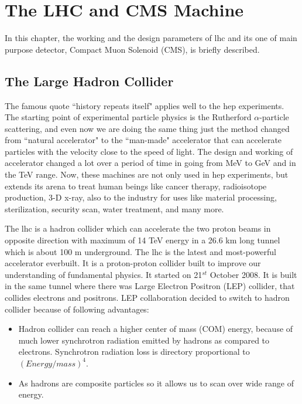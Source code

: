 \chapter{The LHC and CMS Machine} %
\label{cha:the_lhc_and_cms_machine}

In this chapter, the working and the design parameters of \acrfull{lhc} and its one of main purpose detector, Compact Muon Solenoid (CMS), is briefly described.


\section{The Large Hadron Collider} %
\label{sec:the_large_hadron_collider}

The famous quote ``history repeats itself" applies well to the \acrfull{hep} experiments. The starting point of experimental particle physics is the Rutherford $\alpha$-particle scattering, and even now we are doing the same thing just the method changed from ``natural accelerator" to the ``man-made" accelerator that can accelerate particles with the velocity close to the speed of light. The design and working of accelerator changed a lot over a period of time in going from MeV to GeV and in the TeV range. Now, these machines are not only used in \acrshort{hep} experiments, but extends its arena to treat human beings like cancer therapy, radioisotope production, 3-D x-ray, also to the industry for uses like material processing, sterilization, security scan, water treatment, and many more. 

The \acrshort{lhc} is  a hadron collider which can accelerate the two proton beams in opposite direction with maximum of 14 TeV energy in a 26.6 km long tunnel which is about 100 m underground. The \acrshort{lhc} is the latest and most-powerful accelerator everbuilt. It is a proton-proton collider built to improve our understanding of fundamental physics. It started on 21$^{st}$ October 2008. It is built in the same tunnel where there was Large Electron Positron (LEP) collider, that collides electrons and positrons. LEP collaboration decided to switch to hadron collider because of following advantages:
\begin{itemize}
    \item Hadron collider can reach a higher center of mass (COM) energy, because of much lower synchrotron radiation emitted by hadrons as compared to electrons. Synchrotron radiation loss is directory proportional to $(Energy/mass)^4$. 
    \item As hadrons are composite particles so it allows us to scan over wide range of energy.
\end{itemize}


